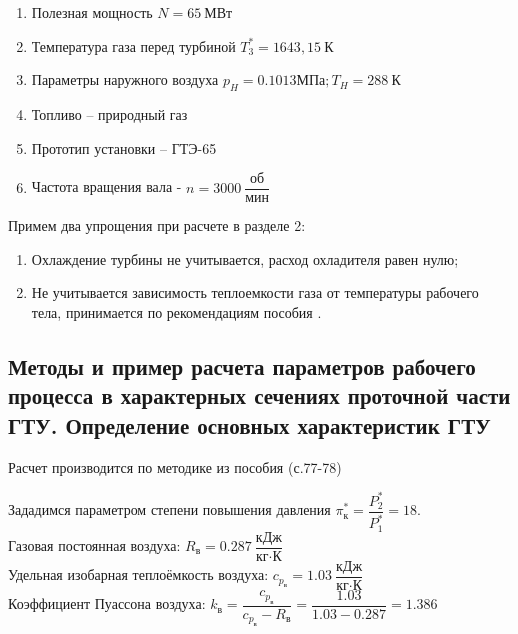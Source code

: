 \begin{enumerate} 
  \item Полезная мощность $N=65 \ \text{МВт}$
  \item Температура газа перед турбиной $T_3^*=1643,15 \ \text{К}$
  \item Параметры наружного воздуха $p_H=0.1013 \text{МПа}; T_H=288 \ \text{К}$
  \item Топливо – природный газ
  \item Прототип установки – ГТЭ-65
  \item Частота вращения вала - $n=3000 \ \dfrac{\text{об}}{\text{мин}}$
\end{enumerate} 
Примем два упрощения при расчете в разделе 2:
\begin{enumerate} 
  \item Охлаждение турбины не учитывается, расход охладителя равен нулю;
  \item Не учитывается зависимость теплоемкости газа от температуры рабочего тела, принимается по рекомендациям пособия \cite{PERV}.
\end{enumerate}



\subsection{Методы и пример расчета параметров рабочего процесса в характерных сечениях проточной части ГТУ. Определение основных характеристик ГТУ}

Расчет производится по методике из пособия \cite{PERV} (с.77-78)

Зададимся параметром степени повышения давления $\pi_{\text{к}}^*=\dfrac{P_{2}^*}{P_{1}^*}=18$. \\
Газовая постоянная воздуха: $R_{\text{в}}=0.287 \ \dfrac{\text{кДж}}{\text{кг}\cdot \text{К}}$ \\
Удельная изобарная теплоёмкость воздуха: $c_{p_\text{в}}=1.03 \ \dfrac{\text{кДж}}{\text{кг}\cdot \text{К}}$\\
Коэффициент Пуассона воздуха: $k_{\text{в}}=\dfrac{c_{p_{\text{в}}}}{c_{p_{\text{в}}}-R_{\text{в}}}=\dfrac{1.03}{1.03-0.287}=1.386$\\

